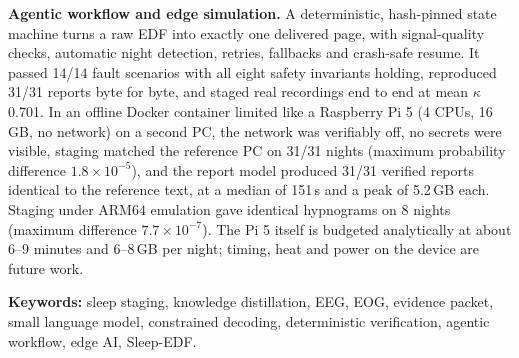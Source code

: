 \textbf{Agentic workflow and edge simulation.} A deterministic, hash-pinned state machine turns a raw EDF into
exactly one delivered page, with signal-quality checks, automatic night detection, retries, fallbacks and
crash-safe resume. It passed 14/14 fault scenarios with all eight safety invariants holding, reproduced 31/31
reports byte for byte, and staged real recordings end to end at mean $\kappa$ 0.701. In an offline Docker container
limited like a Raspberry Pi 5 (4 CPUs, 16\,GB, no network) on a second PC, the network was verifiably off, no secrets
were visible, staging matched the reference PC on 31/31 nights (maximum probability difference $1.8\times10^{-5}$),
and the report model produced 31/31 verified reports identical to the reference text, at a median of 151\,s and a peak
of 5.2\,GB each. Staging under ARM64 emulation gave identical hypnograms on 8 nights (maximum difference
$7.7\times10^{-7}$). The Pi 5 itself is budgeted analytically at about 6--9 minutes and 6--8\,GB per night; timing, heat
and power on the device are future work.

\vspace{0.3cm}
\noindent\textbf{Keywords:} sleep staging, knowledge distillation, EEG, EOG, evidence packet, small language model,
constrained decoding, deterministic verification, agentic workflow, edge AI, Sleep-EDF.
